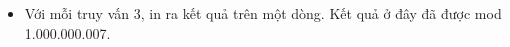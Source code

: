\begin{itemize}
	\item     Với mỗi truy vấn 3, in ra kết quả trên một dòng. Kết quả ở đây đã được mod 1.000.000.007.   
\end{itemize}